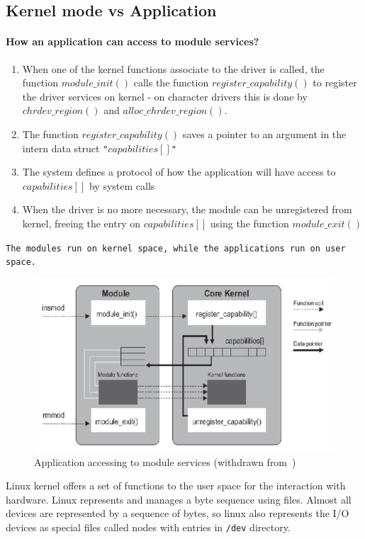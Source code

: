 \subsection{Kernel mode vs Application}
\paragraph{\textbf{How an application can access to module services?}}

\begin{enumerate}[label=\roman*.]
%
\item When one of the kernel functions associate to the driver is called, the function \texttt{$module\_init()$} calls the function \texttt{$register\_capability()$} to register the driver services on kernel - on character drivers this is done by \texttt{$chrdev\_region()$} and \texttt{$alloc\_chrdev\_region()$}.
\item The function \texttt{$register\_capability()$} saves a pointer to an argument in the intern data struct \texttt{"$capabilities[]$"}
\item The system defines a protocol of how the application
will have access to \texttt{$capabilities[]$} by system calls
\item When the driver is no more necessary, the module
can be unregistered from kernel, freeing the entry on
\texttt{$capabilities[]$} using the function \texttt{$module\_exit()$}
%
\end{enumerate}

\texttt{The modules run on kernel space, while the applications run on user space.}

\begin{figure}[htb!]
\centering
    \includegraphics[width=0.6\columnwidth]{./img/ddrivers-kernel.png}
  \caption{Application accessing to module services (withdrawn from~\cite{ddrivers-slides})}%
\label{fig:ddrivers-kernel}
\end{figure}

Linux kernel offers a set of functions to the user space for the interaction with hardware.
Linux represents and manages a byte sequence using files.
Almost all devices are represented by a sequence of bytes, so linux also represents the I/O devices as special files called nodes with entries in \texttt{/dev} directory.

